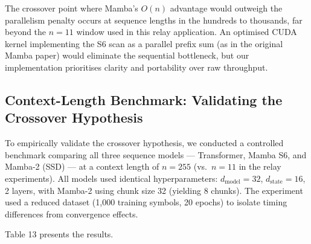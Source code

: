 \documentclass[
  english,
  12pt,
  12pt,
  a4paper,
  oneside]{report}
\begin{document}
The crossover point where Mamba's \(O(n)\) advantage would outweigh the parallelism penalty occurs at sequence lengths in the hundreds to thousands, far beyond the \(n = 11\) window used in this relay application. An optimised CUDA kernel implementing the S6 scan as a parallel prefix sum (as in the original Mamba paper) would eliminate the sequential bottleneck, but our implementation prioritises clarity and portability over raw throughput.

\subsection{Context-Length Benchmark: Validating the Crossover Hypothesis}\label{sec:context-length-benchmark-validating-the-crossover-hypothesis}

To empirically validate the crossover hypothesis, we conducted a controlled benchmark comparing all three sequence models --- Transformer, Mamba S6, and Mamba-2 (SSD) --- at a context length of \(n = 255\) (vs.~\(n = 11\) in the relay experiments). All models used identical hyperparameters: \(d_{\text{model}} = 32\), \(d_{\text{state}} = 16\), 2 layers, with Mamba-2 using chunk size 32 (yielding 8 chunks). The experiment used a reduced dataset (1,000 training symbols, 20 epochs) to isolate timing differences from convergence effects.

Table 13 presents the results.
\end{document}
